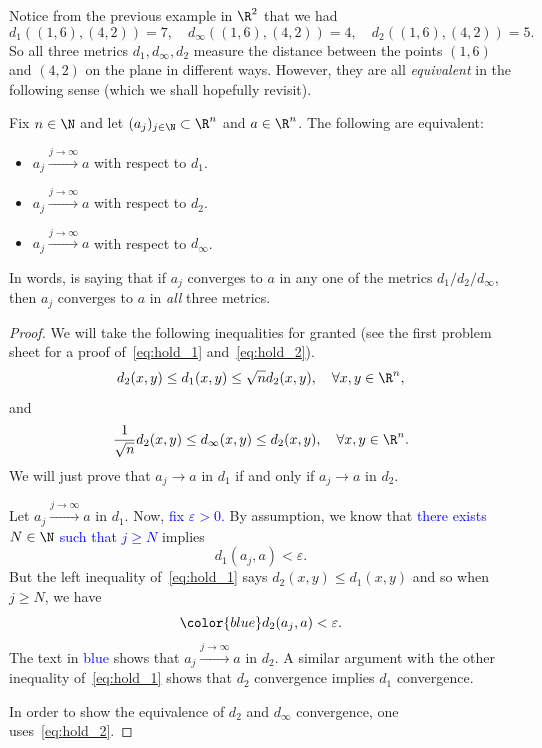 Notice from the previous example in $\R^2$ that we had
\[
d_1((1,6),(4,2)) = 7,\quad d_\infty((1,6),(4,2)) = 4,\quad d_2((1,6),(4,2)) = 5.
\]
So all three metrics $d_1,d_\infty, d_2$ measure the distance between the points $(1,6)$ and $(4,2)$ on the plane in different ways. However, they are all \textit{equivalent} in the following sense (which we shall hopefully revisit).
\begin{prop}
\label{prop:equiv_d12inf}
Fix $n\in\N$ and let $(a_j)_{j\in\N}\subset \R^n$ and $a\in \R^n$. The following are equivalent:
\begin{itemize}
	\item $a_j\overset{j\to \infty}{\to}a$ with respect to $d_1$.
	\item $a_j\overset{j\to \infty}{\to}a$ with respect to $d_2$.
	\item $a_j\overset{j\to \infty}{\to}a$ with respect to $d_\infty$.
\end{itemize}
\end{prop}
In words,  is saying that if $a_j$ converges to $a$ in any one of the metrics $d_1 / d_2 / d_\infty$, then $a_j$ converges to $a$ in \textit{all} three metrics.
\begin{proof}
We will take the following inequalities for granted (see the first problem sheet for a proof of~\eqref{eq:hold_1} and~\eqref{eq:hold_2}).
\begin{equation}
	\label{eq:hold_1}
	d_2(x,y) \le d_1(x,y)\le \sqrt{n} d_2(x,y),\quad \forall x,y\in\R^n,
\end{equation}
and
\begin{equation}
	\label{eq:hold_2}
	\frac{1}{\sqrt{n}}d_2(x,y)\le d_\infty(x,y)\le d_2(x,y),\quad\forall x,y\in\R^n.
\end{equation}
We will just prove that $a_j \to a$ in $d_1$ if and only if $a_j\to a$ in $d_2$.

Let $a_j\overset{j\to \infty}{\to}a$ in $d_1$. Now, \textcolor{blue}{fix $\varepsilon>0$.} By assumption, we know that \textcolor{blue}{there exists $N\in\N$ such that $j\ge N$} implies
\[
d_1(a_j,a)<\varepsilon.
\]
But the left inequality of~\eqref{eq:hold_1} says $d_2(x,y)\le d_1(x,y)$ and so when $j\ge N$, we have
\[
{\color{blue}
d_2(a_j,a)<\varepsilon.
}
\]
The text in \textcolor{blue}{blue} shows that $a_j \overset{j\to \infty}{\to} a$ in $d_2$. A similar argument with the other inequality of~\eqref{eq:hold_1} shows that $d_2$ convergence implies $d_1$ convergence.

In order to show the equivalence of $d_2$ and $d_\infty$ convergence, one uses~\eqref{eq:hold_2}.
\end{proof}

